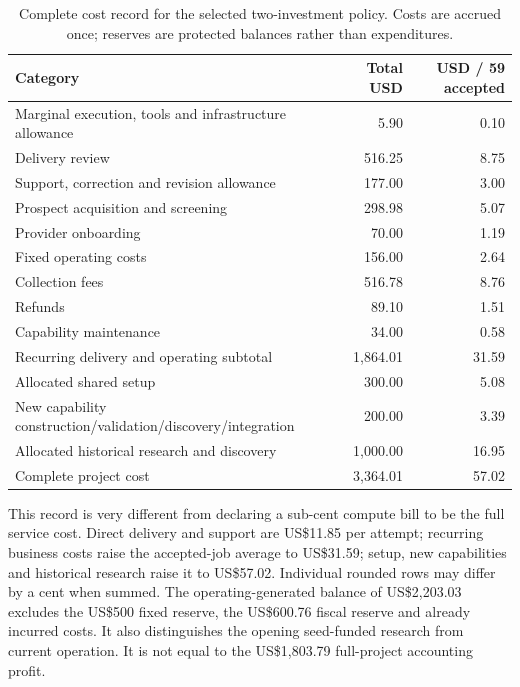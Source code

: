 \documentclass[11pt,letterpaper]{article}
\newcommand{\usd}[1]{US\$#1}
\begin{document}
\begin{table}[htbp]\small
\caption{Complete cost record for the selected two-investment policy. Costs are accrued once; reserves are protected balances rather than expenditures.}
\begin{tabularx}{\linewidth}{@{}Yrr@{}}
\toprule
Category & Total USD & USD / 59 accepted \\
\midrule
Marginal execution, tools and infrastructure allowance & 5.90 & 0.10 \\
Delivery review & 516.25 & 8.75 \\
Support, correction and revision allowance & 177.00 & 3.00 \\
Prospect acquisition and screening & 298.98 & 5.07 \\
Provider onboarding & 70.00 & 1.19 \\
Fixed operating costs & 156.00 & 2.64 \\
Collection fees & 516.78 & 8.76 \\
Refunds & 89.10 & 1.51 \\
Capability maintenance & 34.00 & 0.58 \\
\midrule
Recurring delivery and operating subtotal & 1,864.01 & 31.59 \\
Allocated shared setup & 300.00 & 5.08 \\
New capability construction/validation/discovery/integration & 200.00 & 3.39 \\
Allocated historical research and discovery & 1,000.00 & 16.95 \\
\midrule
Complete project cost & 3,364.01 & 57.02 \\
\bottomrule
\end{tabularx}
\label{tab:casecost}
\end{table}
This record is very different from declaring a sub-cent compute bill to be the full service cost. Direct delivery and support are \usd{11.85} per attempt; recurring business costs raise the accepted-job average to \usd{31.59}; setup, new capabilities and historical research raise it to \usd{57.02}. Individual rounded rows may differ by a cent when summed. The operating-generated balance of \usd{2,203.03} excludes the \usd{500} fixed reserve, the \usd{600.76} fiscal reserve and already incurred costs. It also distinguishes the opening seed-funded research from current operation. It is not equal to the \usd{1,803.79} full-project accounting profit.
\end{document}
